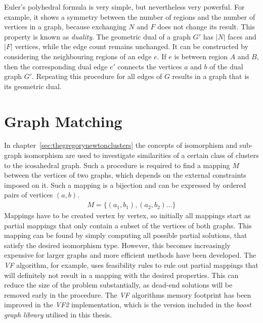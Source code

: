Euler's polyhedral formula is very simple, but nevertheless very powerful. For
example, it shows a symmetry between the number of regions and the number of
vertices in a graph, because exchanging $N$ and $F$ does not change its result.
This property is known as \textit{duality}. The geometric dual of a graph $G'$
has $|N|$ faces and $|F|$ vertices, while the edge count remains unchanged. It
can be constructed by considering the neighbouring regions of an edge $e$. If
$e$ is between region $A$ and $B$, then the corresponding dual edge $e'$
connects the vertices $a$ and $b$ of the dual graph $G'$. Repeating this
procedure for all edges of $G$ results in a graph that is its geometric dual.

\section{Graph Matching}
\label{sec:AlgorithmGraph}

In chapter~\ref{sec:thegregorynewtonclusters} the concepts of isomorphism and
sub-graph isomorphism  are used to investigate similarities of a certain class
of clusters to the icosahedral graph. Such a procedure is required to find a
mapping $M$ between the vertices of two graphs, which depends on the external
constraints imposed on it. Such a mapping is a bijection and can be expressed by
ordered pairs of vertices $(a,b)$.
%
\begin{align}
    M=\{(a_1,b_1),(a_2,b_2)\dots\}
\end{align}
%
Mappings have to be created vertex by vertex, so initially all mappings start as
partial mappings that only contain a subset of the vertices of both graphs. This
mapping can be found by simply computing all possible partial solutions, that
satisfy the desired isomorphism type. However, this becomes increasingly
expensive for larger graphs and more efficient methods have been developed. The
\textit{VF} algorithm\autocite{Cordella_SubgraphTransformationsInexact_1998},
for example, uses feasibility rules to rule out partial mappings that will
definitely not result in a mapping with the desired properties. This can reduce
the size of the problem substantially, as dead-end solutions will be removed
early in the procedure. The \textit{VF} algorithms memory footprint has been
improved in the \textit{VF2}
implementation,\autocite{Cordella_ImprovedAlgorithmMatching_2001} which is the
version included in the \textit{boost graph
library}\autocite{Siek_BoostGraphLibrary_2002} utilised in this thesis.



